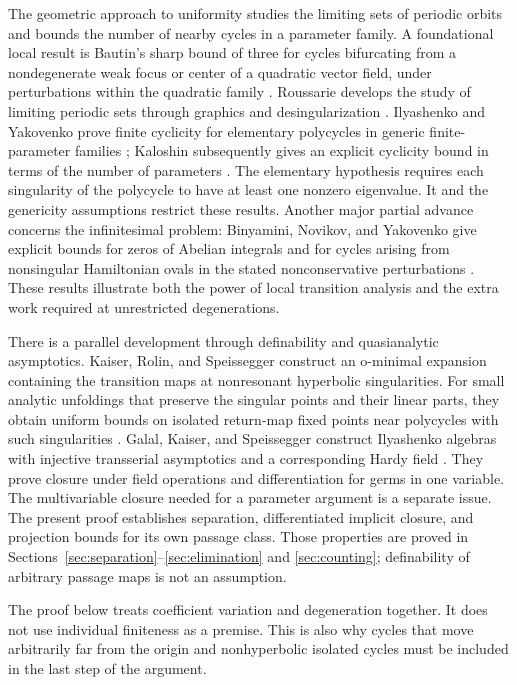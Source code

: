 The geometric approach to uniformity studies the limiting sets of
periodic orbits and bounds the number of nearby cycles in a parameter
family. A foundational local result is Bautin's sharp bound of three
for cycles bifurcating from a nondegenerate weak focus or center of a
quadratic vector field, under perturbations within the quadratic family
\citep[\S3]{Bautin1952}.
Roussarie develops the study of limiting periodic sets through graphics
and desingularization \citep{Roussarie1998}.
Ilyashenko and Yakovenko prove finite cyclicity for elementary
polycycles in generic finite-parameter families
\citep{IlyashenkoYakovenko1995}; Kaloshin subsequently gives an explicit
cyclicity bound in terms of the number of parameters \citep{Kaloshin2003}.
The elementary hypothesis requires each singularity of the polycycle
to have at least one nonzero eigenvalue. It and the genericity assumptions
restrict these results. Another major partial advance concerns the
infinitesimal problem: Binyamini, Novikov, and Yakovenko give explicit
bounds for zeros of Abelian integrals and for cycles arising from
nonsingular Hamiltonian ovals in the stated nonconservative perturbations
\citep{BinyaminiNovikovYakovenko2010}. These results illustrate both the
power of local transition analysis and the extra work required at
unrestricted degenerations.

There is a parallel development through definability and quasianalytic
asymptotics. Kaiser, Rolin, and Speissegger construct an o-minimal
expansion containing the transition maps at nonresonant hyperbolic
singularities. For small analytic unfoldings that preserve the singular
points and their linear parts, they obtain uniform bounds on isolated
return-map fixed points near polycycles with such singularities
\citep{KaiserRolinSpeissegger2009}.
Galal, Kaiser, and Speissegger construct Ilyashenko algebras with
injective transserial asymptotics and a corresponding Hardy field
\citep{GalalKaiserSpeissegger2020}. They prove closure under field
operations and differentiation for germs in one variable. The
multivariable closure needed for a parameter argument is a separate
issue. The present
proof establishes separation, differentiated implicit closure, and
projection bounds for its own passage class. Those properties are proved
in Sections~\ref{sec:separation}--\ref{sec:elimination} and
\ref{sec:counting}; definability of arbitrary passage maps is not an
assumption.

The proof below treats coefficient variation and degeneration together.
It does not use individual finiteness as a premise. This is also why
cycles that move arbitrarily far from the origin and nonhyperbolic
isolated cycles must be included in the last step of the argument.

